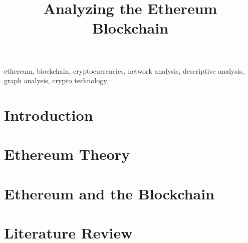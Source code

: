 \documentclass[conference]{IEEEtran}
\begin{document}
\title{Analyzing the Ethereum Blockchain}


\author{
\and
{}
\and
{}
}


\maketitle

\begin{abstract}

\end{abstract}


\begin{IEEEkeywords}
ethereum, blockchain, cryptocurrencies, network analysis, descriptive analysis, graph analysis, crypto technology
\end{IEEEkeywords}

\section{Introduction}
\label{introduction}


\section{Ethereum Theory}
\label{ethereum-theory}


\section{Ethereum and the Blockchain}
\label{ethereum-blockchain}


\section{Literature Review}
\label{literature-review}

\end{document}
